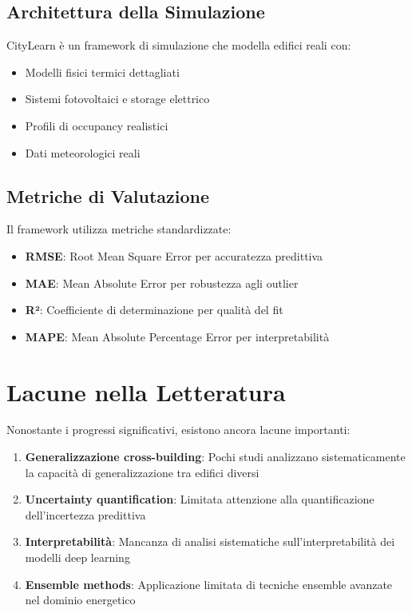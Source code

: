 \documentclass[12pt,a4paper,twoside]{report}
\begin{document}
\subsection{Architettura della Simulazione}

CityLearn \cite{vazquez2020citylearn} è un framework di simulazione che modella edifici reali con:

\begin{itemize}
    \item Modelli fisici termici dettagliati
    \item Sistemi fotovoltaici e storage elettrico
    \item Profili di occupancy realistici
    \item Dati meteorologici reali
\end{itemize}

\subsection{Metriche di Valutazione}

Il framework utilizza metriche standardizzate:

\begin{itemize}
    \item \textbf{RMSE}: Root Mean Square Error per accuratezza predittiva
    \item \textbf{MAE}: Mean Absolute Error per robustezza agli outlier  
    \item \textbf{R²}: Coefficiente di determinazione per qualità del fit
    \item \textbf{MAPE}: Mean Absolute Percentage Error per interpretabilità
\end{itemize}

\section{Lacune nella Letteratura}

Nonostante i progressi significativi, esistono ancora lacune importanti:

\begin{enumerate}
    \item \textbf{Generalizzazione cross-building}: Pochi studi analizzano sistematicamente la capacità di generalizzazione tra edifici diversi
    
    \item \textbf{Uncertainty quantification}: Limitata attenzione alla quantificazione dell'incertezza predittiva
    
    \item \textbf{Interpretabilità}: Mancanza di analisi sistematiche sull'interpretabilità dei modelli deep learning
    
    \item \textbf{Ensemble methods}: Applicazione limitata di tecniche ensemble avanzate nel dominio energetico
\end{enumerate}
\end{document}
